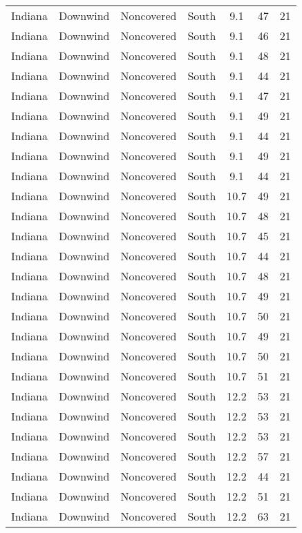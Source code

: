 \documentclass{article}
\begin{document}
\begin{longtable}[H]{ccccccc}
Indiana & Downwind & Noncovered & South  & 9.1  & 47 & 21 \\
Indiana & Downwind & Noncovered & South  & 9.1  & 46 & 21 \\
Indiana & Downwind & Noncovered & South  & 9.1  & 48 & 21 \\
Indiana & Downwind & Noncovered & South  & 9.1  & 44 & 21 \\
Indiana & Downwind & Noncovered & South  & 9.1  & 47 & 21 \\
Indiana & Downwind & Noncovered & South  & 9.1  & 49 & 21 \\
Indiana & Downwind & Noncovered & South  & 9.1  & 44 & 21 \\
Indiana & Downwind & Noncovered & South  & 9.1  & 49 & 21 \\
Indiana & Downwind & Noncovered & South  & 9.1  & 44 & 21 \\
Indiana & Downwind & Noncovered & South  & 10.7 & 49 & 21 \\
Indiana & Downwind & Noncovered & South  & 10.7 & 48 & 21 \\
Indiana & Downwind & Noncovered & South  & 10.7 & 45 & 21 \\
Indiana & Downwind & Noncovered & South  & 10.7 & 44 & 21 \\
Indiana & Downwind & Noncovered & South  & 10.7 & 48 & 21 \\
Indiana & Downwind & Noncovered & South  & 10.7 & 49 & 21 \\
Indiana & Downwind & Noncovered & South  & 10.7 & 50 & 21 \\
Indiana & Downwind & Noncovered & South  & 10.7 & 49 & 21 \\
Indiana & Downwind & Noncovered & South  & 10.7 & 50 & 21 \\
Indiana & Downwind & Noncovered & South  & 10.7 & 51 & 21 \\
Indiana & Downwind & Noncovered & South  & 12.2 & 53 & 21 \\
Indiana & Downwind & Noncovered & South  & 12.2 & 53 & 21 \\
Indiana & Downwind & Noncovered & South  & 12.2 & 53 & 21 \\
Indiana & Downwind & Noncovered & South  & 12.2 & 57 & 21 \\
Indiana & Downwind & Noncovered & South  & 12.2 & 44 & 21 \\
Indiana & Downwind & Noncovered & South  & 12.2 & 51 & 21 \\
Indiana & Downwind & Noncovered & South  & 12.2 & 63 & 21 \\

\end{longtable}
\end{document}
